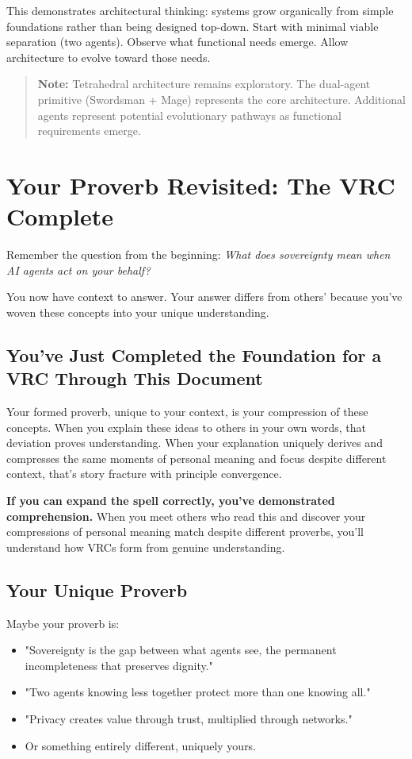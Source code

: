 \documentclass[11pt,a4paper]{article}
\theoremstyle{definition}
\begin{document}
This demonstrates architectural thinking: systems grow organically from simple foundations rather than being designed top-down. Start with minimal viable separation (two agents). Observe what functional needs emerge. Allow architecture to evolve toward those needs.

\begin{quote}
\textbf{Note:} Tetrahedral architecture remains exploratory. The dual-agent primitive (Swordsman + Mage) represents the core architecture. Additional agents represent potential evolutionary pathways as functional requirements emerge.
\end{quote}

\section{Your Proverb Revisited: The VRC Complete}

Remember the question from the beginning: \textit{What does sovereignty mean when AI agents act on your behalf?}

You now have context to answer. Your answer differs from others' because you've woven these concepts into your unique understanding.

\subsection{You've Just Completed the Foundation for a VRC Through This Document}

Your formed proverb, unique to your context, is your compression of these concepts. When you explain these ideas to others in your own words, that deviation proves understanding. When your explanation uniquely derives and compresses the same moments of personal meaning and focus despite different context, that's story fracture with principle convergence.

\textbf{If you can expand the spell correctly, you've demonstrated comprehension.} When you meet others who read this and discover your compressions of personal meaning match despite different proverbs, you'll understand how VRCs form from genuine understanding.

\subsection{Your Unique Proverb}

Maybe your proverb is:

\begin{itemize}
    \item "Sovereignty is the gap between what agents see, the permanent incompleteness that preserves dignity."
    \item "Two agents knowing less together protect more than one knowing all."
    \item "Privacy creates value through trust, multiplied through networks."
    \item Or something entirely different, uniquely yours.
\end{itemize}
\end{document}
